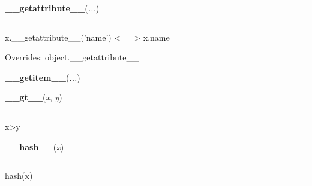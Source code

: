     \vspace{0.5ex}

    \begin{boxedminipage}{\textwidth}

    \raggedright \textbf{\_\_getattribute\_\_}(\textit{...})

    \vspace{-1.5ex}

    \rule{\textwidth}{0.5\fboxrule}

x.{\_}{\_}getattribute{\_}{\_}('name') {\textless}=={\textgreater} x.name
    \vspace{1ex}

      Overrides: object.\_\_getattribute\_\_

    \end{boxedminipage}

    \label{bitarray:_bitarray:__getitem__}

    \vspace{0.5ex}

    \begin{boxedminipage}{\textwidth}

    \raggedright \textbf{\_\_getitem\_\_}(\textit{...})

    \end{boxedminipage}

    \label{bitarray:_bitarray:__gt__}

    \vspace{0.5ex}

    \begin{boxedminipage}{\textwidth}

    \raggedright \textbf{\_\_gt\_\_}(\textit{x}, \textit{y})

    \vspace{-1.5ex}

    \rule{\textwidth}{0.5\fboxrule}

x{\textgreater}y
    \vspace{1ex}

    \end{boxedminipage}

    \label{object:__hash__}

    \vspace{0.5ex}

    \begin{boxedminipage}{\textwidth}

    \raggedright \textbf{\_\_hash\_\_}(\textit{x})

    \vspace{-1.5ex}

    \rule{\textwidth}{0.5\fboxrule}

hash(x)
    \vspace{1ex}

    \end{boxedminipage}

